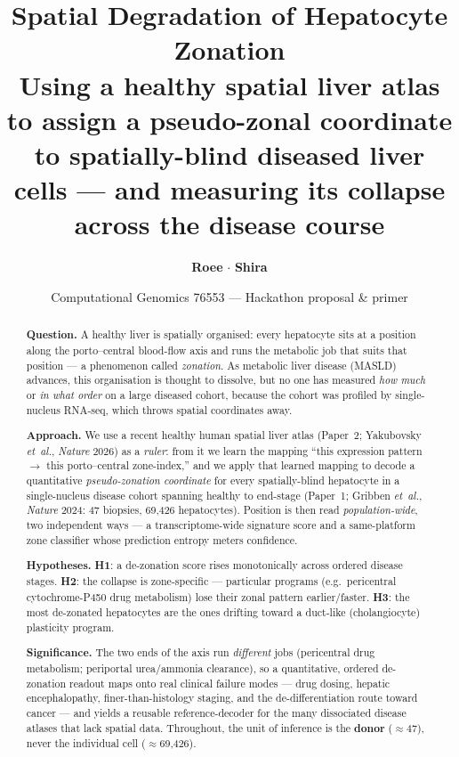 \documentclass[11pt]{article}
\title{\textcolor{dark0}{\textbf{Spatial Degradation of Hepatocyte Zonation}}\\[4pt]
\large\textcolor{teal0}{Using a healthy spatial liver atlas to assign a pseudo-zonal coordinate
to spatially-blind diseased liver cells --- and measuring its collapse across the disease course}}
\author{\textbf{Roee} $\cdot$ \textbf{Shira}}
\date{Computational Genomics 76553 --- Hackathon proposal \& primer}
\begin{document}
\maketitle

\begin{abstract}
\noindent\textbf{Question.} A healthy liver is spatially organised: every hepatocyte sits at a
position along the porto--central blood-flow axis and runs the metabolic job that suits that
position --- a phenomenon called \emph{zonation}. As metabolic liver disease (MASLD) advances, this
organisation is thought to dissolve, but no one has measured \emph{how much} or \emph{in what order}
on a large diseased cohort, because the cohort was profiled by single-nucleus RNA-seq, which throws
spatial coordinates away.

\noindent\textbf{Approach.} We use a recent healthy human spatial liver atlas (Paper~2; Yakubovsky
\emph{et~al.}, \emph{Nature} 2026) as a \emph{ruler}: from it we learn the mapping ``this expression
pattern $\to$ this porto--central zone-index,'' and we apply that learned mapping to decode a
quantitative \emph{pseudo-zonation coordinate} for every spatially-blind hepatocyte in a
single-nucleus disease cohort spanning healthy to end-stage (Paper~1; Gribben \emph{et~al.},
\emph{Nature} 2024: 47 biopsies, 69{,}426 hepatocytes). Position is then read \emph{population-wide},
two independent ways --- a transcriptome-wide signature score and a same-platform zone classifier
whose prediction entropy meters confidence.

\noindent\textbf{Hypotheses.} \textbf{H1}: a de-zonation score rises monotonically across ordered
disease stages. \textbf{H2}: the collapse is zone-specific --- particular programs (e.g.\ pericentral
cytochrome-P450 drug metabolism) lose their zonal pattern earlier/faster. \textbf{H3}: the most
de-zonated hepatocytes are the ones drifting toward a duct-like (cholangiocyte) plasticity program.

\noindent\textbf{Significance.} The two ends of the axis run \emph{different} jobs (pericentral drug
metabolism; periportal urea/ammonia clearance), so a quantitative, ordered de-zonation readout maps
onto real clinical failure modes --- drug dosing, hepatic encephalopathy, finer-than-histology
staging, and the de-differentiation route toward cancer --- and yields a reusable reference-decoder
for the many dissociated disease atlases that lack spatial data. Throughout, the unit of inference is
the \textbf{donor} ($\approx$47), never the individual cell ($\approx$69{,}426).
\end{abstract}
\end{document}
